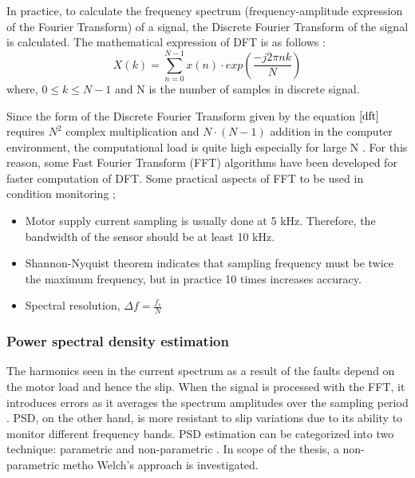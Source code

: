 In practice, to calculate the frequency spectrum (frequency-amplitude expression of the Fourier Transform) of a signal, the Discrete Fourier Transform of the signal is calculated. The mathematical expression of DFT is as follows \cite{allen2004signal}:
\begin{equation}
X(k)= \displaystyle\sum_{n=0}^{N-1}x(n)\cdot exp\left({\frac{-j2\pi nk}{N}}\right)
\label{dft}
\end{equation}
where, $0 \leq k \leq N-1$ and N is the number of samples in discrete signal.

Since the form of the Discrete Fourier Transform given by the equation $\ref{dft}$ requires $N^2$ complex multiplication and $N\cdot (N-1)$ addition in the computer environment, the computational load is quite high especially for large N \cite{hayes2009statistical,orfanidis1995introduction,allen2004signal,randall2021vibration}. For this reason, some Fast Fourier Transform (FFT) algorithms have been developed for faster computation of DFT. Some practical aspects of FFT to be used in condition monitoring \cite{bonaldi2012predictive};

\begin{itemize}
	\item Motor supply current sampling is usually done at 5 kHz. Therefore, the bandwidth of the sensor should be at least 10 kHz.  
	\item Shannon-Nyquist theorem indicates that sampling frequency must be twice the maximum frequency, but in practice 10 times increases accuracy.
	\item Spectral resolution, $\Delta f = \displaystyle\frac{f_s}{N}$
\end{itemize}

\subsubsection{Power spectral density estimation}

The harmonics seen in the current spectrum as a result of the faults depend on the motor load and hence the slip. When the signal is processed with the FFT, it introduces errors as it averages the spectrum amplitudes over the sampling period \cite{cusidocusido2008fault,irvine2002introduction}. PSD, on the other hand, is more resistant to slip variations due to its ability to monitor different frequency bands. PSD estimation can be categorized into two technique: parametric and non-parametric \cite{zerdani2020inter,heydarzadeh2016gearbox}. In scope of the thesis, a non-parametric metho Welch's approach is investigated.

